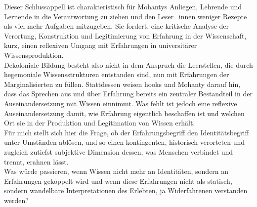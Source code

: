 \noindent Dieser Schlussappell ist charakteristisch für Mohantys Anliegen, Lehrende und
Lernende in die Verantwortung zu ziehen und den Leser\_innen weniger Rezepte
als viel mehr Aufgaben mitzugeben. Sie fordert, eine kritische Analyse der
Verortung, Konstruktion und Legitimierung von Erfahrung in der Wissenschaft,
kurz, einen reflexiven Umgang mit Erfahrungen in universitärer
Wissensproduktion.\\
Dekoloniale Bildung besteht also nicht in dem Anspruch die Leerstellen, die
durch hegemoniale Wissensstrukturen entstanden sind, nun mit Erfahrungen der
Marginalisierten zu füllen. Stattdessen weisen hooks und Mohanty darauf hin,
dass das Sprechen aus und über Erfahrung bereits ein zentraler Bestandteil in
der Auseinandersetzung mit Wissen einnimmt. Was fehlt ist jedoch eine reflexive
Auseinandersetzung damit, wie Erfahrung eigentlich beschaffen ist und welchen
Ort sie in der Produktion und Legitimation von Wissen erhält. \\

\noindent Für mich stellt sich hier die Frage, ob der Erfahrungsbegriff den
Identitätsbegriff unter Umständen ablösen, und so einen kontingenten,
historisch verorteten und zugleich zutiefst subjektive Dimension dessen, was
Menschen verbindet und trennt, erahnen lässt.\\  

\noindent Was würde passieren, wenn Wissen nicht mehr an
Identitäten, sondern an Erfahrungen gekoppelt wird und wenn diese Erfahrungen
nicht als statisch, sondern wandelbare Interpretationen des Erlebten, ja
Widerfahrenen verstanden werden? 
